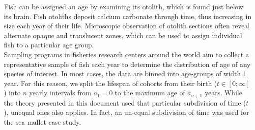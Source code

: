 Fish can be assigned an age by examining its otolith, which is found just below its brain. Fish otoliths deposit calcium carbonate through time, thus increasing in size each year of their life. Microscopic observation of otolith sections often reveal alternate opaque and translucent zones, which can be used to assign individual fish to a particular age group. \\ 

Sampling programs in fisheries research centers around the world aim to collect a representative sample of fish each year to determine the distribution of age of any species of interest. In most cases, the data are binned into age-groups of width 1 year. For this reason, we split the lifespan of cohorts from their birth ($t \in [0;\infty]$) into $n$ yearly intervals from $a_{1}=0$ to the maximum age of $a_{n+1}$ years. While the theory presented in this document used that particular subdivision of time ($t$), unequal ones also applies. In fact, an un-equal subdivision of time was used for the sea mullet case study.
 
